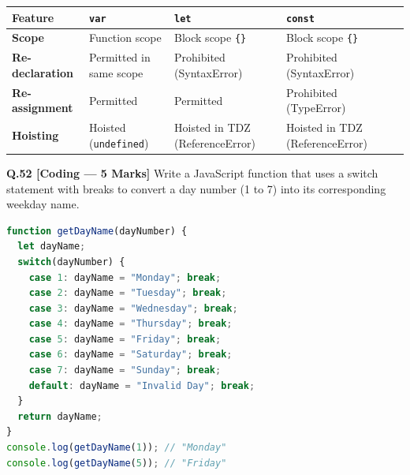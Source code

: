 \begin{qbsolutionbox}[Answer to Q.51]
\begin{center}
\begin{tabularx}{\textwidth}{l X X X X}
\toprule
\textbf{Feature} & \textbf{\texttt{var}} & \textbf{\texttt{let}} & \textbf{\texttt{const}} \\
\midrule
\textbf{Scope} & Function scope & Block scope \texttt{\{\}} & Block scope \texttt{\{\}} \\
\textbf{Re-declaration} & Permitted in same scope & Prohibited (SyntaxError) & Prohibited (SyntaxError) \\
\textbf{Re-assignment} & Permitted & Permitted & Prohibited (TypeError) \\
\textbf{Hoisting} & Hoisted (\texttt{undefined}) & Hoisted in TDZ (ReferenceError) & Hoisted in TDZ (ReferenceError) \\
\bottomrule
\end{tabularx}
\end{center}
\end{qbsolutionbox}

\noindent\textbf{Q.52 [Coding --- 5 Marks]} Write a JavaScript function that uses a switch statement with breaks to convert a day number (1 to 7) into its corresponding weekday name.

\begin{qbsolutionbox}[Answer to Q.52]
\begin{lstlisting}[language=JavaScript]
function getDayName(dayNumber) {
  let dayName;
  switch(dayNumber) {
    case 1: dayName = "Monday"; break;
    case 2: dayName = "Tuesday"; break;
    case 3: dayName = "Wednesday"; break;
    case 4: dayName = "Thursday"; break;
    case 5: dayName = "Friday"; break;
    case 6: dayName = "Saturday"; break;
    case 7: dayName = "Sunday"; break;
    default: dayName = "Invalid Day"; break;
  }
  return dayName;
}
console.log(getDayName(1)); // "Monday"
console.log(getDayName(5)); // "Friday"
\end{lstlisting}
\end{qbsolutionbox}

